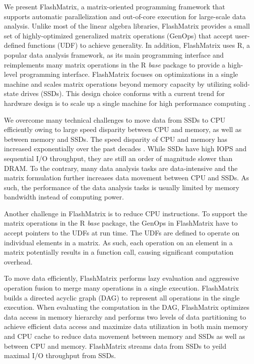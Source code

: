 
We present FlashMatrix, a matrix-oriented programming framework that supports
automatic parallelization and out-of-core execution for large-scale data analysis.
Unlike most of the linear algebra libraries, FlashMatrix provides a small
set of highly-optimized generalized matrix operations (GenOps) that accept
user-defined functions (UDF) to achieve generality. In addition, FlashMatrix
uses R, a popular data analysis framework, as its main programming interface
and reimplements many matrix operations in the R \textit{base} package to provide
a high-level programming interface. FlashMatrix focuses on optimizations in
a single machine and scales matrix operations beyond memory capacity by utilizing
solid-state drives (SSDs). This design choice conforms with a current trend for
hardware design is to scale up a single machine for high performance computing
\cite{Ang14}.


We overcome many technical challenges to move data from SSDs to CPU efficiently
owing to large speed disparity between CPU and memory, as well as between memory and
SSDs. The speed disparity of CPU and memory has increased exponentially over
the past decades \cite{Wilkes01}. While SSDs have high IOPS and sequential
I/O throughput, they are still an order of magnitude slower than DRAM.
To the contrary, many data analysis tasks are data-intensive and the matrix
formulation further increases data movement between CPU and SSDs. As such,
the performance of the data analysis tasks is usually limited by memory
bandwidth instead of computing power.

Another challenge in FlashMatrix is to reduce CPU instructions. To support
the matrix operations in the R \textit{base} package, the GenOps in FlashMatrix
have to accept pointers to the UDFs at run time. The UDFs are defined to
operate on individual elements in a matrix. As such, each operation on an element
in a matrix potentially results in a function call, causing significant
computation overhead.

To move data efficiently, FlashMatrix performs lazy evaluation and aggressive
operation fusion to merge many operations in a single execution.
FlashMatrix builds a directed acyclic graph (DAG) to represent all operations
in the single execution. When evaluating the computation in the DAG, FlashMatrix
optimizes data access in memory hierarchy and performs two levels of data
partitioning to achieve efficient data access and maximize data utilization in
both main memory and CPU cache to reduce data movement between memory and SSDs
as well as between CPU and memory. FlashMatrix streams data from SSDs to yeild
maximal I/O throughput from SSDs.


